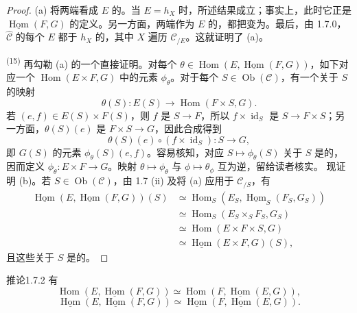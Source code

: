 \begin{proof}
(a) 将两端看成 $E$ 的。当 $E=h_X$ 时，所述结果成立；事实上，此时它正是 $\underline{\operatorname{Hom}}(F,G)$ 的定义。另一方面，两端作为 $E$ 的，都把变为。最后，由 1.7.0，$\widehat{\mathcal C}$ 的每个 $E$ 都于 $h_X$ 的，其中 $X$ 遍历 $\mathcal C_{/E}$。这就证明了 (a)。

\textsuperscript{(15)} 再勾勒 (a) 的一个直接证明。对每个 $\theta\in\operatorname{Hom}(E,\underline{\operatorname{Hom}}(F,G))$，如下对应一个 $\operatorname{Hom}(E\times F,G)$ 中的元素 $\phi_\theta$。对于每个 $S\in\operatorname{Ob}(\mathcal C)$，有一个关于 $S$ 的映射
\[
\theta(S):E(S)\longrightarrow\operatorname{Hom}(F\times S,G).
\]
若 $(e,f)\in E(S)\times F(S)$，则 $f$ 是 $S\to F$，所以 $f\times\operatorname{id}_S$ 是 $S\to F\times S$；另一方面，$\theta(S)(e)$ 是 $F\times S\to G$，因此合成得到
\[
\theta(S)(e)\circ(f\times\operatorname{id}_S):S\longrightarrow G,
\]
即 $G(S)$ 的元素 $\phi_\theta(S)(e,f)$。容易核知，对应 $S\mapsto\phi_\theta(S)$ 关于 $S$ 是的，因而定义 $\phi_\theta:E\times F\to G$。映射 $\theta\mapsto\phi_\theta$ 与 $\phi\mapsto\theta_\phi$ 互为逆，留给读者核实。
现证明 (b)。若 $S\in\operatorname{Ob}(\mathcal C)$，由 1.7 (ii) 及将 (a) 应用于 $\mathcal C_{/S}$，有
\[
\begin{aligned}
\underline{\operatorname{Hom}}(E,\underline{\operatorname{Hom}}(F,G))(S)
&\simeq\operatorname{Hom}_S(E_S,\underline{\operatorname{Hom}}_S(F_S,G_S))\\
&\simeq\operatorname{Hom}_S(E_S\times_SF_S,G_S)\\
&\simeq\operatorname{Hom}(E\times F\times S,G)\\
&\simeq\underline{\operatorname{Hom}}(E\times F,G)(S),
\end{aligned}
\]
且这些关于 $S$ 是的。
\end{proof}
\begin{SGAresult}{推论}{1.7.2}
有
\[
\operatorname{Hom}(E,\underline{\operatorname{Hom}}(F,G))\simeq\operatorname{Hom}(F,\underline{\operatorname{Hom}}(E,G)),
\]
\[
\underline{\operatorname{Hom}}(E,\underline{\operatorname{Hom}}(F,G))\simeq\underline{\operatorname{Hom}}(F,\underline{\operatorname{Hom}}(E,G)).
\]
\end{SGAresult}
